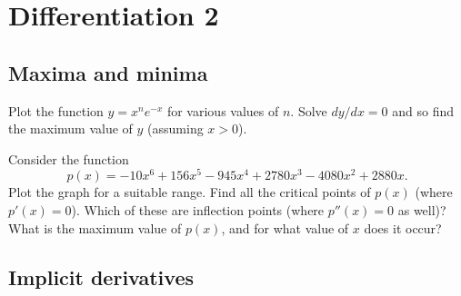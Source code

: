 \documentclass[a4paper,10pt]{amsbook}
\numberwithin{example}{chapter}
\begin{document}
\chapter{Differentiation 2}

\section{Maxima and minima}

\begin{exercise}\label{ex-polyexp-max}
 Plot the function $y=x^ne^{-x}$ for various values of $n$.
 Solve $dy/dx=0$ and so find the maximum value of $y$
 (assuming $x>0$).
\end{exercise}

\begin{exercise}\label{ex-poly-max}
 Consider the function
 \[ p(x) = -10x^6+156x^5-945x^4+2780x^3-4080x^2+2880x. \]
 Plot the graph for a suitable range.  Find all the critical
 points of $p(x)$ (where $p'(x)=0$).  Which of these are
 inflection points (where $p''(x)=0$ as well)?  What is the
 maximum value of $p(x)$, and for what value of $x$ does it
 occur? 
\end{exercise}

\section{Implicit derivatives}
\end{document}
